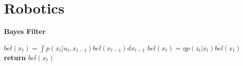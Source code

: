 \chapter{Robotics}


\begin{algorithm}
    \renewcommand{\thealgorithm}{} %
    \caption{\textbf{Bayes Filter}}\label{alg:cap}

    \begin{algorithmic}[1]
        \State $\overline{bel}(x_t) = \int{p(x_t|u_t, x_{t-1})bel(x_{t-1})dx_{t-1}}$
        \State $bel(x_t) = \eta{}p(z_t|x_t)\overline{bel}(x_t)$
        \EndFor
        \State \textbf{return} $bel(x_t)$
        \EndFunction

    \end{algorithmic}
\end{algorithm}

